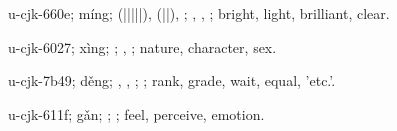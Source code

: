 \begin{multicols}{2}
{\cjkgGlue{}u-cjk-660e; míng; \cjkgGlue{}\cjkgGlue{}(\cjkgGlue{}|\cjkgGlue{}|\cjkgGlue{}|\cjkgGlue{}|\cjkgGlue{}|\cjkgGlue{}), \cjkgGlue{}\cjkgGlue{}(\cjkgGlue{}|\cjkgGlue{}|\cjkgGlue{}), \cjkgGlue{}\cjkgGlue{}\cjkgGlue{}; \cjkgGlue{}, \cjkgGlue{}, \cjkgGlue{}; bright, light, brilliant, clear.

\cjkgGlue{}u-cjk-6027; xìng; \cjkgGlue{}; \cjkgGlue{}, \cjkgGlue{}; nature, character, sex.

\cjkgGlue{}u-cjk-7b49; děng; \cjkgGlue{}\cjkgGlue{}\cjkgGlue{}, \cjkgGlue{}, \cjkgGlue{}; \cjkgGlue{}; rank, grade, wait, equal, 'etc.'.

\cjkgGlue{}u-cjk-611f; gǎn; \cjkgGlue{}; \cjkgGlue{}; feel, perceive, emotion.

}
\end{multicols}
